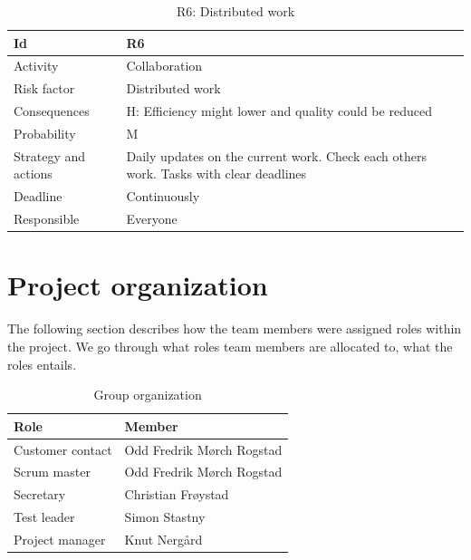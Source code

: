 \documentclass[11pt]{book}
\begin{document}
\begin{table}[H]
\centering
\begin{tabular}{ l  p{11cm} }
    Id                      & R6                                                                          \\ \hline
    Activity                & Collaboration                                                               \\ \hline
    Risk factor             & Distributed work                                                            \\ \hline
    Consequences            & H: Efficiency might lower and quality could be reduced                      \\ \hline
    Probability             & M                                                                           \\ \hline
    Strategy and actions    & Daily updates on the current work. Check each others work. Tasks with 
                              clear deadlines                                                             \\ \hline
    Deadline                & Continuously                                                                \\ \hline
    Responsible             & Everyone                                                                    \\ 
\end{tabular}
\caption{R6: Distributed work}
\label{tab:risk_6}
\end{table}

\section{Project organization}
The following section describes how the team members were assigned roles within the project. We go through what roles team members are allocated to, what the roles entails.

\begin{table}[H]
\centering
    \begin{tabular}{ l  p{11cm}  }
    Role                    & Member                                                                      \\ \hline
    Customer contact        & Odd Fredrik Mørch Rogstad                                                   \\ \hline
    Scrum master            & Odd Fredrik Mørch Rogstad                                                   \\ \hline
    Secretary               & Christian Frøystad                                                          \\ \hline
    Test leader             & Simon Stastny                                                               \\ \hline
    Project manager         & Knut Nergård                                                                \\
\end{tabular}
\caption{Group organization}
\label{tab:org}
\end{table}
\end{document}
